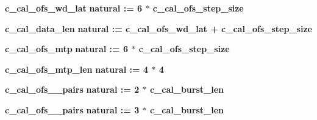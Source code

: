 \begin{DoxyCompactItemize}
\item 
{\bf c\+\_\+cal\+\_\+ofs\+\_\+wd\+\_\+lat} {\bfseries \textcolor{comment}{natural}\textcolor{vhdlchar}{ }\textcolor{vhdlchar}{ }\textcolor{vhdlchar}{\+:}\textcolor{vhdlchar}{=}\textcolor{vhdlchar}{ }\textcolor{vhdlchar}{ } \textcolor{vhdldigit}{6} \textcolor{vhdlchar}{$\ast$}\textcolor{vhdlchar}{ }\textcolor{vhdlchar}{ }\textcolor{vhdlchar}{ }{\bfseries {\bf c\+\_\+cal\+\_\+ofs\+\_\+step\+\_\+size}} \textcolor{vhdlchar}{ }} 
\item 
{\bf c\+\_\+cal\+\_\+data\+\_\+len} {\bfseries \textcolor{comment}{natural}\textcolor{vhdlchar}{ }\textcolor{vhdlchar}{ }\textcolor{vhdlchar}{\+:}\textcolor{vhdlchar}{=}\textcolor{vhdlchar}{ }\textcolor{vhdlchar}{ }\textcolor{vhdlchar}{ }\textcolor{vhdlchar}{ }{\bfseries {\bf c\+\_\+cal\+\_\+ofs\+\_\+wd\+\_\+lat}} \textcolor{vhdlchar}{+}\textcolor{vhdlchar}{ }\textcolor{vhdlchar}{ }\textcolor{vhdlchar}{ }{\bfseries {\bf c\+\_\+cal\+\_\+ofs\+\_\+step\+\_\+size}} \textcolor{vhdlchar}{ }} 
\item 
{\bf c\+\_\+cal\+\_\+ofs\+\_\+mtp} {\bfseries \textcolor{comment}{natural}\textcolor{vhdlchar}{ }\textcolor{vhdlchar}{ }\textcolor{vhdlchar}{\+:}\textcolor{vhdlchar}{=}\textcolor{vhdlchar}{ }\textcolor{vhdlchar}{ } \textcolor{vhdldigit}{6} \textcolor{vhdlchar}{$\ast$}\textcolor{vhdlchar}{ }\textcolor{vhdlchar}{ }\textcolor{vhdlchar}{ }{\bfseries {\bf c\+\_\+cal\+\_\+ofs\+\_\+step\+\_\+size}} \textcolor{vhdlchar}{ }} 
\item 
{\bf c\+\_\+cal\+\_\+ofs\+\_\+mtp\+\_\+len} {\bfseries \textcolor{comment}{natural}\textcolor{vhdlchar}{ }\textcolor{vhdlchar}{ }\textcolor{vhdlchar}{\+:}\textcolor{vhdlchar}{=}\textcolor{vhdlchar}{ }\textcolor{vhdlchar}{ } \textcolor{vhdldigit}{4} \textcolor{vhdlchar}{$\ast$}\textcolor{vhdlchar}{ } \textcolor{vhdldigit}{4} \textcolor{vhdlchar}{ }} 
\item 
{\bf c\+\_\+cal\+\_\+ofs\+\_\+\_\+pairs} {\bfseries \textcolor{comment}{natural}\textcolor{vhdlchar}{ }\textcolor{vhdlchar}{ }\textcolor{vhdlchar}{\+:}\textcolor{vhdlchar}{=}\textcolor{vhdlchar}{ }\textcolor{vhdlchar}{ } \textcolor{vhdldigit}{2} \textcolor{vhdlchar}{$\ast$}\textcolor{vhdlchar}{ }\textcolor{vhdlchar}{ }\textcolor{vhdlchar}{ }{\bfseries {\bf c\+\_\+cal\+\_\+burst\+\_\+len}} \textcolor{vhdlchar}{ }} 
\item 
{\bf c\+\_\+cal\+\_\+ofs\+\_\+\_\+pairs} {\bfseries \textcolor{comment}{natural}\textcolor{vhdlchar}{ }\textcolor{vhdlchar}{ }\textcolor{vhdlchar}{\+:}\textcolor{vhdlchar}{=}\textcolor{vhdlchar}{ }\textcolor{vhdlchar}{ } \textcolor{vhdldigit}{3} \textcolor{vhdlchar}{$\ast$}\textcolor{vhdlchar}{ }\textcolor{vhdlchar}{ }\textcolor{vhdlchar}{ }{\bfseries {\bf c\+\_\+cal\+\_\+burst\+\_\+len}} \textcolor{vhdlchar}{ }} 

\end{DoxyCompactItemize}
